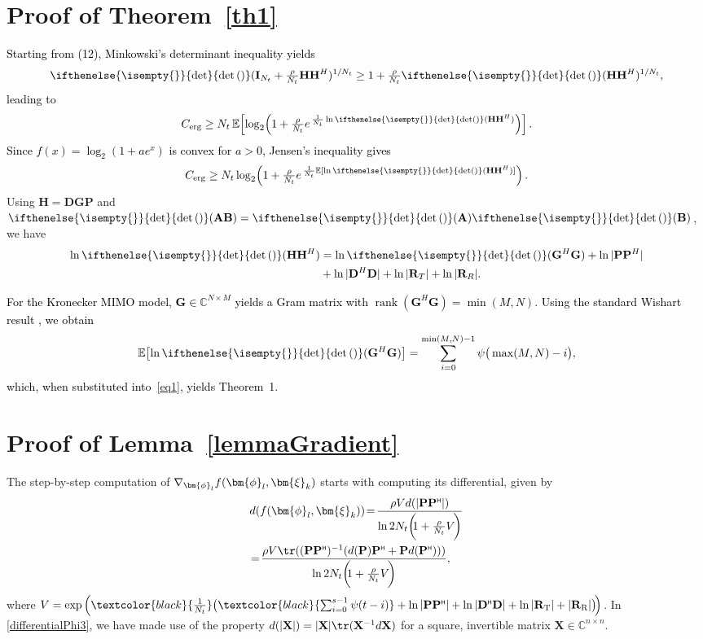 \documentclass[twocolumn,10pt]{IEEEtran}
\newcommand{\vect}[1]{{\lowercase{\mbs{#1}}}}
\newcommand{\mbs}[1]{\bm{#1}}
\renewcommand{\H}{{\scriptscriptstyle\mathsf{H}}}
\newcommand{\bphi}{\vect{\phi}}
\def\bD{{\mathbf{D}}}
\def\bP{{\mathbf{P}}}
\def\bR{{\mathbf{R}}}
\def\bX{{\mathbf{X}}}
\def\bxi{{\bm{\xi}}}
\def\bxi{{\bm{\xi}}}
\renewcommand{\det}[1][]{\ifthenelse{\isempty{#1}}{\text{det}}{\text{det}\left(#1\right)}}
\def\nn{\nonumber}
\begin{document}
	\begin{appendices}
		\section{Proof of Theorem~\ref{th1}}\label{th1proof}	
	\textcolor{black}{	Starting from (12),
			Minkowski's determinant inequality yields
		\[
		\det(\mathbf{I}_{N_t}+\tfrac{\rho}{N_t}\mathbf{H}\mathbf{H}^H)^{1/N_t}
		\ge 1+\tfrac{\rho}{N_t}\det(\mathbf{H}\mathbf{H}^H)^{1/N_t},
		\]
		leading to
		\[
		C_{\mathrm{erg}}
		\ge N_t\,\mathbb{E}\!\left[
		\log_2\!\left(1+\tfrac{\rho}{N_t}
		e^{\,\frac{1}{N_t}\ln\det(\mathbf{H}\mathbf{H}^H)}\right)
		\right].
		\]
		Since $f(x)=\log_2(1+a e^x)$ is convex for $a>0$, Jensen's inequality gives
		\[
		C_{\mathrm{erg}}
		\ge N_t\log_2\!\left(
		1+\tfrac{\rho}{N_t}
		e^{\,\frac{1}{N_t}\mathbb{E}[\ln\det(\mathbf{H}\mathbf{H}^H)]}
		\right).
		\]}
		Using $\mathbf{H}=\mathbf{D}\mathbf{G}\mathbf{P}$ and
		$\det(\mathbf{AB})=\det(\mathbf{A})\det(\mathbf{B})$, we have
		\begin{align}
			\ln\det(\mathbf{H}\mathbf{H}^H)
		&= \ln\det(\mathbf{G}^H\mathbf{G})
		+ \ln|\mathbf{P}\mathbf{P}^H|\nn\\
		&		+ \ln|\mathbf{D}^H\mathbf{D}|
		+ \ln|\mathbf{R}_T| + \ln|\mathbf{R}_R|.\label{eq1}
	\end{align}
	
	\textcolor{black}{For the Kronecker MIMO model, $\mathbf{G}\in\mathbb{C}^{N\times M}$
	yields a Gram matrix with $\operatorname{rank}(\mathbf{G}^H\mathbf{G})=
	\min(M,N)$. Using the standard Wishart result \cite[A.8.1]{Grant2002}, we
	obtain
	\[
	\mathbb{E}\!\left[\ln\det(\mathbf{G}^H\mathbf{G})\right]
	= \sum_{i=0}^{\min(M,N)-1}\psi\big(\max(M,N)-i\big),
	\]
	which, when substituted into~\eqref{eq1}, yields Theorem~1.}
		
		
		
		
			
		\section{Proof of Lemma~\ref{lemmaGradient}}\label{lem1}
		The step-by-step computation of  	$ \nabla_{\bphi_{l}}f(\bphi_{l},\bxi_{k}) $ starts with computing its differential, given by
		\begin{align}
			&	d(f(\bphi_{l},\bxi_{k}))
			\!=\! \frac{\rho V d(|\bP\bP^{\H}|)}{ \ln2 N_{t} \bigg(\!\!1+\frac{\rho}{N_{t}} V\!\bigg)}\label{differentialPhi2}\\
			&\!=\! \frac{ \rho V\tr((\bP\bP^{\H})^{-1} (d(\bP)\bP^{\H}+\bP d(\bP^{\H})  )) }{ \ln2  N_{t} \bigg(\!\!1+\frac{\rho}{N_{t}} V\!\bigg)},\label{differentialPhi3}
		\end{align}
		where $ V=\exp \Big(\textcolor{black}{\frac{1}{N_{t}}}\big(\textcolor{black}{\sum_{i=0}^{s-1}\psi(t-i)}+\ln |\bP\bP^{\H}|+\ln |\bD^{\H}\bD|+\ln |\bR_{\mathrm{T}}|+|\bR_{\mathrm{R}}|\big)\!\Big)$. 	In \eqref{differentialPhi3}, we have made use of the property $d(|\bX|)=|\bX|\tr(\bX^{-1} d \bX)$ for a square, invertible matrix $\bX \in \mathbb{C}^{n \times n}$.
		

\end{appendices}
\end{document}
